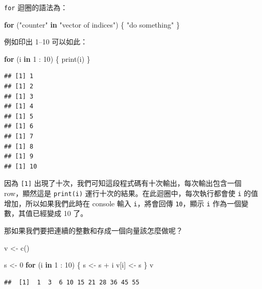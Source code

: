 \documentclass[
]{book}
\newenvironment{Shaded}{\begin{snugshade}}{\end{snugshade}}
\newcommand{\ControlFlowTok}[1]{\textcolor[rgb]{0.13,0.29,0.53}{\textbf{#1}}}
\newcommand{\DecValTok}[1]{\textcolor[rgb]{0.00,0.00,0.81}{#1}}
\newcommand{\FunctionTok}[1]{\textcolor[rgb]{0.00,0.00,0.00}{#1}}
\newcommand{\NormalTok}[1]{#1}
\newcommand{\OtherTok}[1]{\textcolor[rgb]{0.56,0.35,0.01}{#1}}
\newcommand{\SpecialCharTok}[1]{\textcolor[rgb]{0.00,0.00,0.00}{#1}}
\newcommand{\StringTok}[1]{\textcolor[rgb]{0.31,0.60,0.02}{#1}}
\theoremstyle{definition}
\theoremstyle{remark}
\begin{document}
\texttt{for} 迴圈的語法為：

\begin{Shaded}
\begin{Highlighting}[]
\ControlFlowTok{for}\NormalTok{ (}\StringTok{"counter"} \ControlFlowTok{in} \StringTok{"vector of indices"}\NormalTok{) \{ }
  \StringTok{"do something"}
\NormalTok{\}}
\end{Highlighting}
\end{Shaded}

例如印出 1--10 可以如此：

\begin{Shaded}
\begin{Highlighting}[]
\ControlFlowTok{for}\NormalTok{ (i }\ControlFlowTok{in} \DecValTok{1} \SpecialCharTok{:} \DecValTok{10}\NormalTok{) \{}
  \FunctionTok{print}\NormalTok{(i)}
\NormalTok{\}}
\end{Highlighting}
\end{Shaded}

\begin{verbatim}
## [1] 1
## [1] 2
## [1] 3
## [1] 4
## [1] 5
## [1] 6
## [1] 7
## [1] 8
## [1] 9
## [1] 10
\end{verbatim}

因為 \texttt{{[}1{]}} 出現了十次，我們可知這段程式碼有十次輸出，每次輸出包含一個 row，顯然這是 \texttt{print(i)} 運行十次的結果。在此迴圈中，每次執行都會使 \texttt{i} 的值增加，所以如果我們此時在 console 輸入 \texttt{i}，將會回傳 \texttt{10}，顯示 \texttt{i} 作為一個變數，其值已經變成 10 了。

那如果我們要把連續的整數和存成一個向量該怎麼做呢？

\begin{Shaded}
\begin{Highlighting}[]
\NormalTok{v }\OtherTok{\textless{}{-}} \FunctionTok{c}\NormalTok{()}

\NormalTok{s }\OtherTok{\textless{}{-}} \DecValTok{0}
\ControlFlowTok{for}\NormalTok{ (i }\ControlFlowTok{in} \DecValTok{1} \SpecialCharTok{:} \DecValTok{10}\NormalTok{) \{}
\NormalTok{  s }\OtherTok{\textless{}{-}}\NormalTok{ s }\SpecialCharTok{+}\NormalTok{ i}
\NormalTok{  v[i] }\OtherTok{\textless{}{-}}\NormalTok{ s}
\NormalTok{\}}
\NormalTok{v}
\end{Highlighting}
\end{Shaded}

\begin{verbatim}
##  [1]  1  3  6 10 15 21 28 36 45 55
\end{verbatim}
\end{document}
